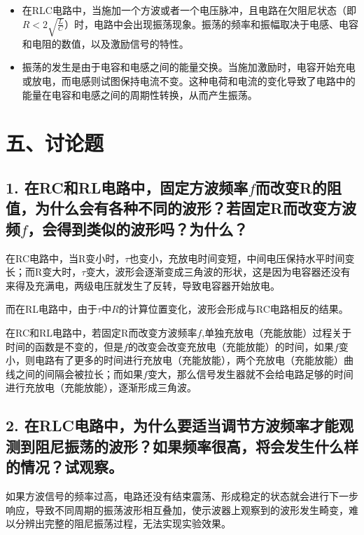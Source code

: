 \documentclass{ctexart}
\begin{document}
\begin{itemize}
    \item 在RLC电路中，当施加一个方波或者一个电压脉冲，且电路在欠阻尼状态（即$R<2\sqrt{\frac{L}{C}}$）时，电路中会出现振荡现象。振荡的频率和振幅取决于电感、电容和电阻的数值，以及激励信号的特性。
    \item 振荡的发生是由于电容和电感之间的能量交换。当施加激励时，电容开始充电或放电，而电感则试图保持电流不变。这种电荷和电流的变化导致了电路中的能量在电容和电感之间的周期性转换，从而产生振荡。
\end{itemize}

\section*{五、讨论题}

\subsection*{1. 在RC和RL电路中，固定方波频率$f$而改变R的阻值，为什么会有各种不同的波形？若固定R而改变方波频$f$，会得到类似的波形吗？为什么？}

在RC电路中，当R变小时，$\tau$也变小，充放电时间变短，中间电压保持水平时间变长；而R变大时，$\tau$变大，波形会逐渐变成三角波的形状，这是因为电容器还没有来得及充满电，两级电压就发生了反转，导致电容器开始放电。

而在RL电路中，由于$\tau$中$R$的计算位置变化，波形会形成与RC电路相反的结果。

在RC和RL电路中，若固定R而改变方波频率$f$,单独充放电（充能放能）过程关于时间的函数是不变的，但是$f$的改变会改变充放电（充能放能）的时间，如果$f$变小，则电路有了更多的时间进行充放电（充能放能），两个充放电（充能放能）曲线之间的间隔会被拉长；而如果$f$变大，那么信号发生器就不会给电路足够的时间进行充放电（充能放能），逐渐形成三角波。

\subsection*{2. 在RLC电路中，为什么要适当调节方波频率才能观测到阻尼振荡的波形？如果频率很高，将会发生什么样的情况？试观察。}

如果方波信号的频率过高，电路还没有结束震荡、形成稳定的状态就会进行下一步响应，导致不同周期的振荡波形相互叠加，使示波器上观察到的波形发生畸变，难以分辨出完整的阻尼振荡过程，无法实现实验效果。
\end{document}
